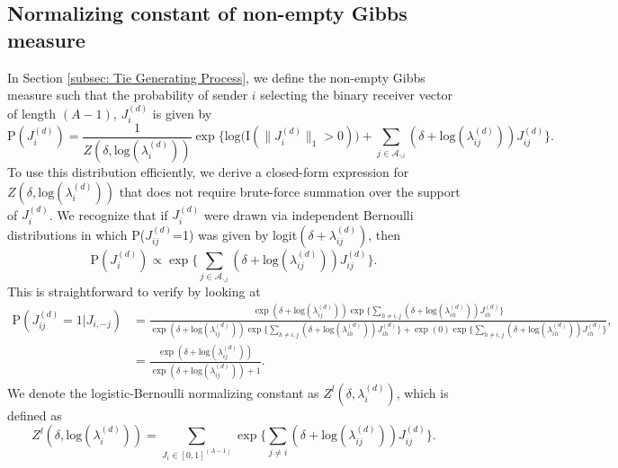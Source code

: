    	 \subsection{Normalizing constant of non-empty Gibbs measure}\label{subsec: non-empty Gibbs measure}
  	 In Section \ref{subsec: Tie Generating Process}, we define the non-empty Gibbs measure such that 
 the probability of sender $i$ selecting the binary receiver vector of length $(A-1)$, $J_i^{(d)}$ is given by
  	 \begin{equation*} \text{P}(J_i^{(d)}) = \frac{1}{Z(\delta,\mbox{log}(\lambda_i^{(d)}))} \exp\Big\{ \mbox{log}\big(\text{I}(\lVert J_i^{(d)} \rVert_1 > 0)\big) + \sum_{j \in \mathcal{A}_{\backslash i}} (\delta+\mbox{log}(\lambda_{ij}^{(d)}))J_{ij}^{(d)} \Big\}.
  	 \end{equation*}
  	 	 To use this distribution efficiently, we derive a closed-form expression for $Z(\delta,\mbox{log}(\lambda_{i}^{(d)}))$ that does not require brute-force summation over the support of $J_i^{(d)}$. We recognize that if $J_i^{(d)}$ were drawn via independent Bernoulli distributions in which P($J_{ij}^{(d)}$=1) was given by logit$(\delta+\lambda_{ij}^{(d)})$, then \begin{equation*}\text{P}(J_i^{(d)}) \propto \exp\Big\{  \sum_{j \in \mathcal{A}_{\backslash i}} (\delta+\mbox{log}(\lambda_{ij}^{(d)}))J_{ij}^{(d)}\Big\}.  	 \end{equation*}
  	 	  This is straightforward to verify by looking at 
  	 	  \begin{equation*}
  	 	  \begin{aligned}\text{P}(J_{ij}^{(d)}=1|J_{i,-j})&=\frac{ \exp{(\delta+\mbox{log}(\lambda_{ij}^{(d)}))}\exp\Big\{ \sum_{h\neq i,j} (\delta+\mbox{log}(\lambda_{ih}^{(d)}))J_{ih}^{(d)} \Big\}}{\exp{(\delta+\mbox{log}(\lambda_{ij}^{(d)}))}\exp\Big\{   \sum_{h\neq i,j} (\delta+\mbox{log}(\lambda_{ih}^{(d)}))J_{ih}^{(d)} \Big\}+ \exp{(0)}\exp\Big\{ \sum_{h\neq i,j} (\delta+\mbox{log}(\lambda_{ih}^{(d)}))J_{ih}^{(d)} \Big\}},\\
  	 	  &=\frac{ \exp{(\delta+\mbox{log}(\lambda_{ij}^{(d)}))}}{\exp{(\delta+\mbox{log}(\lambda_{ij}^{(d)}))} + 1}.\end{aligned}\end{equation*}
  	 	  We denote the logistic-Bernoulli normalizing constant as $Z^{l}(\delta,\lambda_i^{(d)})$, which is defined as 
  	 	  \begin{equation*}
  	 	  Z^{l}(\delta,\mbox{log}(\lambda_{i}^{(d)}))=\sum_{J_i \in [0,1]^{(A-1)}} \exp\Big\{\sum_{j\neq i} (\delta+\mbox{log}(\lambda_{ij}^{(d)}))J_{ij}^{(d)} \Big\}.
  	 	  \end{equation*}
  	 
